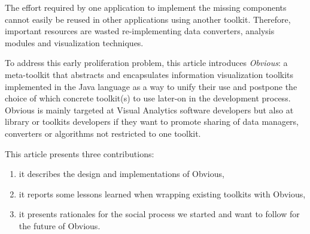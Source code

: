 The effort required by one application to implement the missing
components cannot easily be reused in other applications using another
toolkit.  Therefore, important resources are wasted re-implementing
data converters, analysis modules and visualization techniques. 

To address this early proliferation problem, this article
introduces \emph{Obvious}: a meta-toolkit that abstracts and
encapsulates information visualization toolkits implemented in the
Java language as a way to unify their use and postpone the choice of
which concrete toolkit(s) to use later-on in the development process.
Obvious is mainly targeted at Visual Analytics software developers but
also at library or toolkits developers if they want to promote sharing
of data managers, converters or algorithms not restricted to one
toolkit.

This article presents three contributions:
\begin{enumerate}[noitemsep]
\item it describes the design and implementations of Obvious,
\item it reports some lessons learned when wrapping existing toolkits
  with Obvious,
\item it presents rationales for the social process we started and
  want to follow for the future of Obvious.
\end{enumerate}

